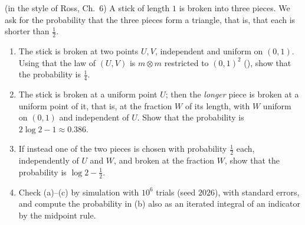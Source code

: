 \begin{exercise}\label{ex:pm-broken-stick}
\hard (in the style of Ross, Ch.~6) A stick of length $1$ is broken into three pieces. We ask
for the probability that the three pieces form a triangle, that is, that each is shorter than
$\frac12$.
\begin{enumerate}[label=(\alph*)]
  \item The stick is broken at two points $U,V$, independent and uniform on $(0,1)$. Using that
    the law of $(U,V)$ is $m\otimes m$ restricted to $(0,1)^2$
    (), show that the probability is $\frac14$.
  \item The stick is broken at a uniform point $U$; then the \emph{longer} piece is broken at a
    uniform point of it, that is, at the fraction $W$ of its length, with $W$ uniform on $(0,1)$
    and independent of $U$. Show that the probability is $2\log2-1\approx0.386$.
  \item If instead one of the two pieces is chosen with probability $\frac12$ each,
    independently of $U$ and $W$, and broken at the fraction $W$, show that the probability is
    $\log2-\frac12$.
  \item Check (a)--(c) by simulation with $10^6$ trials (seed $2026$), with standard errors,
    and compute the probability in (b) also as an iterated integral of an indicator by the
    midpoint rule.
\end{enumerate}
\end{exercise}
